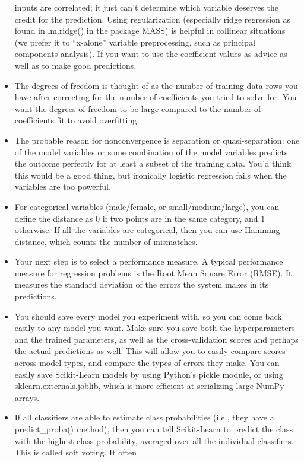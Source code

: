 \documentclass[]{book}
\theoremstyle{definition}
\theoremstyle{definition}
\theoremstyle{definition}
\theoremstyle{remark}
\begin{document}
\begin{itemize}
  inputs are correlated; it just can't determine which variable deserves
  the credit for the prediction. Using regularization (especially ridge
  regression as found in lm.ridge() in the package MASS) is helpful in
  collinear situations (we prefer it to ``x-alone'' variable
  preprocessing, such as principal components analysis). If you want to
  use the coefficient values as advice as well as to make good
  predictions.
\item
  The degrees of freedom is thought of as the number of training data
  rows you have after correcting for the number of coefficients you
  tried to solve for. You want the degrees of freedom to be large
  compared to the number of coefficients fit to avoid overfitting.
\item
  The probable reason for nonconvergence is separation or
  quasi-separation: one of the model variables or some combination of
  the model variables predicts the outcome perfectly for at least a
  subset of the training data. You'd think this would be a good thing,
  but ironically logistic regression fails when the variables are too
  powerful.
\item
  For categorical variables (male/female, or small/medium/large), you
  can define the distance as 0 if two points are in the same category,
  and 1 otherwise. If all the variables are categorical, then you can
  use Hamming distance, which counts the number of mismatches.
\item
  Your next step is to select a performance measure. A typical
  performance measure for regression problems is the Root Mean Square
  Error (RMSE). It measures the standard deviation of the errors the
  system makes in its predictions.
\item
  You should save every model you experiment with, so you can come back
  easily to any model you want. Make sure you save both the
  hyperparameters and the trained parameters, as well as the
  cross-validation scores and perhaps the actual predictions as well.
  This will allow you to easily compare scores across model types, and
  compare the types of errors they make. You can easily save
  Scikit-Learn models by using Python's pickle module, or using
  sklearn.externals.joblib, which is more efficient at serializing large
  NumPy arrays.
\item
  If all classifiers are able to estimate class probabilities (i.e.,
  they have a predict\_proba() method), then you can tell Scikit-Learn
  to predict the class with the highest class probability, averaged over
  all the individual classifiers. This is called soft voting. It often

\end{itemize}
\end{document}
